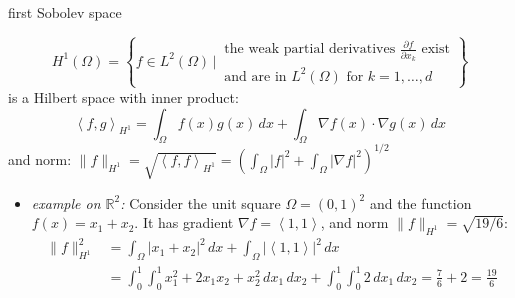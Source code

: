 \documentclass[10pt,
               svgnames,
               hyperref={colorlinks,
                         citecolor=DeepPink4,
                         linkcolor=FireBrick,
                         urlcolor=blue},
               usepdftitle=false]{beamer}
\newcommand{\RR}{\mathbb{R}}
\newcommand{\grad}{\nabla}
\newcommand{\ip}[2]{\left<#1,#2\right>}
\begin{document}
\begin{frame}{first Sobolev space}

\begin{definition}
    $$H^1(\Omega) = \left\{f\in L^2(\Omega) \,\Big|\, \begin{matrix}  \text{the weak partial derivatives } \frac{\partial f}{\partial x_k} \text{ exist} \\ \text{and are in } L^2(\Omega) \text{ for } k=1,\dots,d \end{matrix} \right\}$$
is a Hilbert space with inner product:
	$$\ip{f}{g}_{H^1} = \int_\Omega f(x)g(x)\,dx + \int_\Omega \grad f(x)\cdot \grad g(x)\,dx$$
and norm: \quad $\|f\|_{H^1} = \sqrt{\ip{f}{f}_{H^1}} = \left(\int_\Omega |f|^2 + \int_\Omega |\grad f|^2\right)^{1/2}$
\end{definition}

\begin{itemize}
\small
\item \emph{example on $\RR^2$:} Consider the unit square $\Omega = (0,1)^2$ and the function $f(x)=x_1 + x_2$.  It has gradient $\grad f = \ip{1}{1}$, and norm $\|f\|_{H^1} = \sqrt{19/6}$:
\begin{align*}
\|f\|_{H^1}^2 &= \int_\Omega |x_1 + x_2|^2\,dx + \int_\Omega |\ip{1}{1}|^2\,dx \\
&= \int_0^1 \int_0^1 x_1^2 + 2 x_1 x_2 + x_2^2 \,dx_1\,dx_2 + \int_0^1 \int_0^1 2 \,dx_1\,dx_2 = \frac{7}{6} + 2 = \frac{19}{6}
\end{align*}
\end{itemize}
\end{frame}
\end{document}
